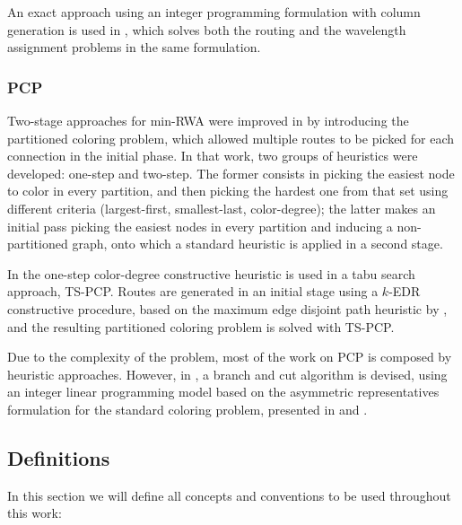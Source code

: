 An exact approach using an integer programming formulation with column generation is used in \cite{lee2002optimization}, which solves both the routing and the wavelength assignment problems in the same formulation.

\subsubsection{PCP}

Two-stage approaches for min-RWA were improved in \cite{Li00thepartition} by introducing the partitioned coloring problem, which allowed multiple routes to be picked for each connection in the initial phase. In that work, two groups of heuristics were developed: one-step and two-step. The former consists in picking the easiest node to color in every partition, and then picking the hardest one from that set using different criteria (largest-first, smallest-last, color-degree); the latter makes an initial pass picking the easiest nodes in every partition and inducing a non-partitioned graph, onto which a standard heuristic is applied in a second stage.

In \cite{noronha2006routing} the one-step color-degree constructive heuristic is used in a tabu search approach, TS-PCP. Routes are generated in an initial stage using a $k$-EDR constructive procedure, based on the maximum edge disjoint path heuristic by \cite{kleinberg1996approximation}, and the resulting partitioned coloring problem is solved with TS-PCP.

Due to the complexity of the problem, most of the work on PCP is composed by heuristic approaches. However, in \cite{frota2010branch}, a branch and cut algorithm is devised, using an integer linear programming model based on the asymmetric representatives formulation for the standard coloring problem, presented in \cite{campelo2004cliques} and \cite{campelo2008asymmetric}.

\subsection{Definitions}
\label{subsec:intro:definitions}

In this section we will define all concepts and conventions to be used throughout this work: 

